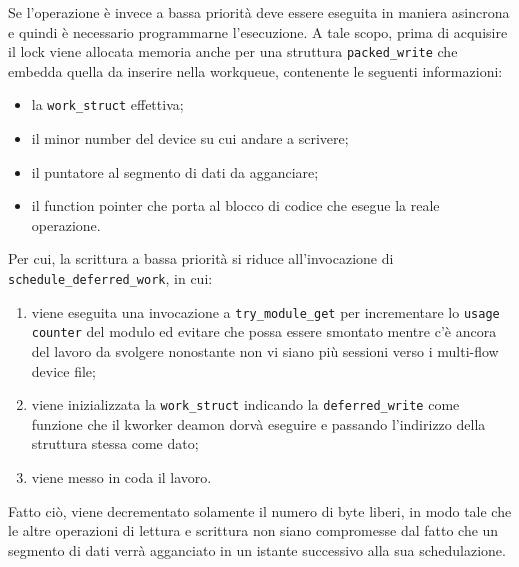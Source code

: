 \documentclass{article}
\begin{document}
Se l'operazione è invece a bassa priorità deve essere eseguita in maniera asincrona e quindi è necessario programmarne l'esecuzione. A tale scopo, prima di acquisire il lock viene allocata memoria anche per una struttura \texttt{packed\_write} che embedda quella da inserire nella workqueue, contenente le seguenti informazioni:
\begin{itemize}
\item la \texttt{work\_struct} effettiva;
\item il minor number del device su cui andare a scrivere;
\item il puntatore al segmento di dati da agganciare;
\item il function pointer che porta al blocco di codice che esegue la reale operazione.
\end{itemize}
Per cui, la scrittura a bassa priorità si riduce all'invocazione di \texttt{schedule\_deferred\_work}, in cui:
\begin{enumerate}
\item viene eseguita una invocazione a \texttt{try\_module\_get} per incrementare lo \texttt{usage counter} del modulo ed evitare che possa essere smontato mentre c'è ancora del lavoro da svolgere nonostante non vi siano più sessioni verso i multi-flow device file;
\item viene inizializzata la \texttt{work\_struct} indicando la \texttt{deferred\_write} come funzione che il kworker deamon dorvà eseguire e passando l'indirizzo della struttura stessa come dato;
\item viene messo in coda il lavoro.
\end{enumerate}
Fatto ciò, viene decrementato solamente il numero di byte liberi, in modo tale che le altre operazioni di lettura e scrittura non siano compromesse dal fatto che un segmento di dati verrà agganciato in un istante successivo alla sua schedulazione.
\end{document}

